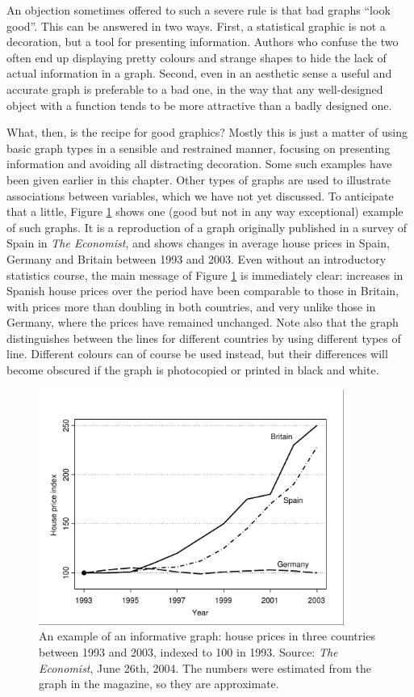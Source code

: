 \documentclass[11pt,a4paper,openany]{book}
\begin{document}
An objection sometimes offered to such a severe rule is that bad graphs
``look good''. This can be answered in two ways. First, a statistical
graphic is not a decoration, but a tool for presenting information.
Authors who confuse the two often end up displaying pretty colours and
strange shapes to hide the lack of actual information in a graph.
Second, even in an aesthetic sense a useful and accurate graph is
preferable to a bad one, in the way that any well-designed object with a
function tends to be more attractive than a badly designed one.

What, then, is the recipe for good graphics? Mostly this is just a
matter of using basic graph types in a sensible and restrained manner,
focusing on presenting information and avoiding all distracting
decoration. Some such examples have been given earlier in this chapter.
Other types of graphs are used to illustrate associations between
variables, which we have not yet discussed. To anticipate that a little,
Figure \ref{fig:f-houseprices} shows one (good but not in any way
exceptional) example of such graphs. It is a reproduction of a graph
originally published in a survey of Spain in \emph{The Economist}, and
shows changes in average house prices in Spain, Germany and Britain
between 1993 and 2003. Even without an introductory statistics course,
the main message of Figure \ref{fig:f-houseprices} is immediately clear:
increases in Spanish house prices over the period have been comparable
to those in Britain, with prices more than doubling in both countries,
and very unlike those in Germany, where the prices have remained
unchanged. Note also that the graph distinguishes between the lines for
different countries by using different types of line. Different colours
can of course be used instead, but their differences will become
obscured if the graph is photocopied or printed in black and white.

\begin{figure}[htbp]
\centering
\includegraphics[width=10.00000cm]{houseprices.pdf}
\caption{\label{fig:f-houseprices} An example of an informative graph: house
prices in three countries between 1993 and 2003, indexed to 100 in 1993.
Source: \emph{The Economist}, June 26th, 2004. The numbers were
estimated from the graph in the magazine, so they are approximate.}
\end{figure}
\end{document}
